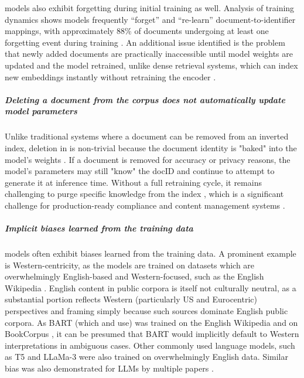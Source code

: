  models also exhibit forgetting during initial training as well. Analysis of training dynamics shows models frequently ``forget'' and ``re-learn'' document-to-identifier mappings, with approximately 88\% of documents undergoing at least one forgetting event during training \cite{sanket-vaibhav-mehta-dsi-updating}. An additional issue identified is the problem that newly added documents are practically inaccessible until model weights are updated and the model retrained, unlike dense retrieval systems, which can index new embeddings instantly without retraining the encoder \cite{tzulin-kuo-a-survey}.

\subparagraph{Deleting a document from the corpus does not automatically update model parameters}
Unlike traditional  systems where a document can be removed from an inverted index, deletion in  is non-trivial because the document identity is "baked" into the model's weights \cite{tzulin-kuo-a-survey}. If a document is removed for accuracy or privacy reasons, the model's parameters may still "know" the docID and continue to attempt to generate it at inference time. Without a full retraining cycle, it remains challenging to purge specific knowledge from the  index 
, which is a significant challenge for production-ready compliance and content management systems \cite{sanket-vaibhav-mehta-dsi-updating}.

\subparagraph{Implicit biases learned from the training data}
 models often exhibit biases learned from the training data. A prominent example is Western-centricity, as the models are trained on datasets which are overwhelmingly English-based and Western-focused, such as the English Wikipedia \cite{kwiatkowski-natural-questions, payal-bajaj-ms-marco}. English content in public corpora is itself not culturally neutral, as a substantial portion reflects Western (particularly US and Eurocentric) perspectives and framing simply because such sources dominate English public corpora. As BART (which  and  use) was trained on the English Wikipedia and on BookCorpus \cite{zhu-aligning,yinhan-liu-roberta-a}, it can be presumed that BART would implicitly default to Western interpretations in ambiguous cases. Other commonly used language models, such as T5 and LLaMa-3 \cite{colin-raffel-exploring-the,aaron-grattafiori-the-llama} were also trained on overwhelmingly English data. Similar bias was also demonstrated for LLMs by multiple papers \cite{tarek-naous-having-beer,md-abdul-aowal-detecting-natural,navigli-biases-in}.

